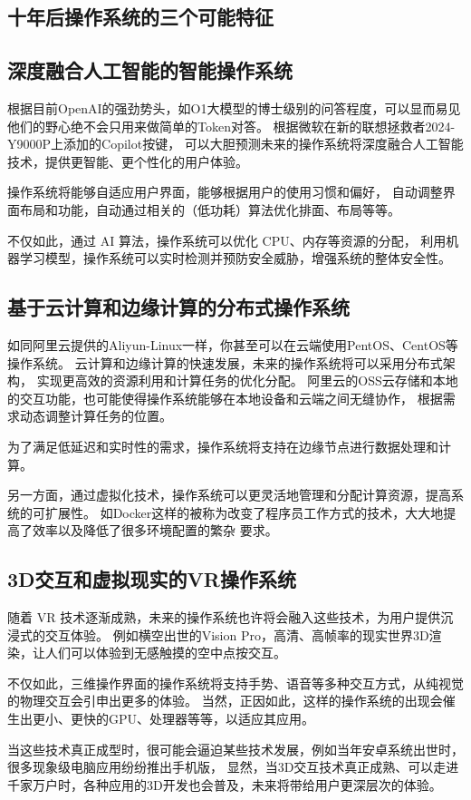 \documentclass[UTF8]{homework}
\begin{document}
\begin{homeworkProblem}

\section{十年后操作系统的三个可能特征}

\subsection{深度融合人工智能的智能操作系统}

根据目前OpenAI的强劲势头，如O1大模型的博士级别的问答程度，可以显而易见他们的野心绝不会只用来做简单的Token对答。
根据微软在新的联想拯救者2024-Y9000P上添加的Copilot按键，
可以大胆预测未来的操作系统将深度融合人工智能技术，提供更智能、更个性化的用户体验。

操作系统将能够自适应用户界面，能够根据用户的使用习惯和偏好，
自动调整界面布局和功能，自动通过相关的（低功耗）算法优化排面、布局等等。

不仅如此，通过 AI 算法，操作系统可以优化 CPU、内存等资源的分配，
利用机器学习模型，操作系统可以实时检测并预防安全威胁，增强系统的整体安全性。

\subsection{基于云计算和边缘计算的分布式操作系统}

如同阿里云提供的Aliyun-Linux一样，你甚至可以在云端使用PentOS、CentOS等操作系统。
云计算和边缘计算的快速发展，未来的操作系统将可以采用分布式架构，\cite{satyanarayanan2017emergence}
实现更高效的资源利用和计算任务的优化分配。
阿里云的OSS云存储和本地的交互功能，也可能使得操作系统能够在本地设备和云端之间无缝协作，
根据需求动态调整计算任务的位置。

为了满足低延迟和实时性的需求，操作系统将支持在边缘节点进行数据处理和计算。

另一方面，通过虚拟化技术，操作系统可以更灵活地管理和分配计算资源，提高系统的可扩展性。
如Docker这样的被称为改变了程序员工作方式的技术，大大地提高了效率以及降低了很多环境配置的繁杂
要求。

\subsection{3D交互和虚拟现实的VR操作系统}

随着 VR 技术逐渐成熟，未来的操作系统也许将会融入这些技术，为用户提供沉浸式的交互体验。
例如横空出世的Vision Pro，高清、高帧率的现实世界3D渲染，让人们可以体验到无感触摸的空中点按交互。

不仅如此，三维操作界面的操作系统将支持手势、语音等多种交互方式，从纯视觉的物理交互会引申出更多的体验。
当然，正因如此，这样的操作系统的出现会催生出更小、更快的GPU、处理器等等，以适应其应用。

当这些技术真正成型时，很可能会逼迫某些技术发展，例如当年安卓系统出世时，很多现象级电脑应用纷纷推出手机版，
显然，当3D交互技术真正成熟、可以走进千家万户时，各种应用的3D开发也会普及，未来将带给用户更深层次的体验。

\end{homeworkProblem}



\end{document}
